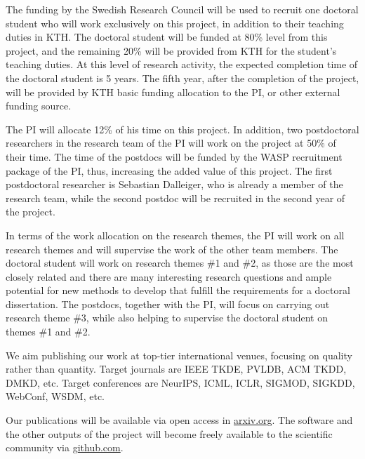 \documentclass[a4paper,11pt]{article}
\begin{document}
The funding by the Swedish Research Council will be used to recruit 
one doctoral student who will work exclusively on this project, 
in addition to their teaching duties in KTH.
The doctoral student will be funded at 80\% level from this project, 
and the remaining 20\% will be provided from KTH for the student's teaching duties. 
At this level of research activity, the expected completion time of the doctoral student is 5 years. 
The fifth year, after the completion of the project, 
will be provided by KTH basic funding allocation to the PI, or other external funding source. 

The PI will allocate 12\% of his time on this project.
In addition, two postdoctoral researchers in the research team of the PI
will work on the project at 50\% of their time. 
The time of the postdocs will be funded by the WASP recruitment package of the PI, 
thus, increasing the added value of this project.
The first postdoctoral researcher is Sebastian Dalleiger, 
who is already a member of the research team, 
while the second postdoc will be recruited in the second year of the project.

In terms of the work allocation on the research themes, 
the PI will work on all research themes and will supervise the work of the other team members. 
The doctoral student will work on research themes \#1 and \#2, 
as those are the most closely related and there are many interesting research questions
and ample potential for new methods to develop that fulfill the requirements for a doctoral dissertation. 
The postdocs, together with the PI, will focus on carrying out research theme \#3,
while also helping to supervise the doctoral student on themes \#1 and \#2.

We aim publishing our work at top-tier international venues, 
focusing on quality rather than quantity.
% 
Target journals 
are IEEE TKDE, PVLDB, ACM TKDD,  DMKD, etc. 
Target conferences are NeurIPS, ICML, ICLR, SIGMOD, SIGKDD, WebConf, WSDM, etc.

Our publications will be available via open access in {\small\url{arxiv.org}}. 
The software and the other outputs of the project 
will become freely available to the scientific community via {\small\url{github.com}}. %
\end{document}
